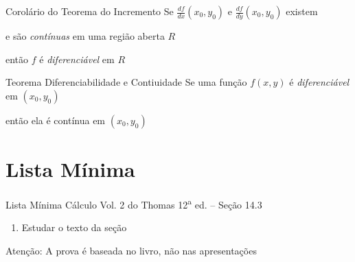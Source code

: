 \begin{frame}{Corolário do Teorema do Incremento}
    Se \(\frac{df}{dx}(x_0, y_0)\) e \(\frac{df}{dy}(x_0, y_0)\) existem

    \pause
    \vspace{0.5\baselineskip}
    e são \emph{contínuas} em uma região aberta $R$

    \pause
    \vspace{0.5\baselineskip}
    então $f$ é \emph{diferenciável} em $R$
\end{frame}

\begin{frame}{Teorema Diferenciabilidade e Contiuidade}
    Se uma função $f(x, y)$ é \emph{diferenciável} em \((x_0, y_0)\)

    \pause
    \vspace{0.5\baselineskip}
    então ela é contínua em \((x_0, y_0)\)
\end{frame}

\section{Lista Mínima}

\begin{frame}{Lista Mínima}
  Cálculo Vol. 2 do Thomas 12\textsuperscript{a} ed. -- Seção 14.3
  \begin{enumerate}
    \item Estudar o texto da seção
  \end{enumerate}

  \vfill
  Atenção: A prova é baseada no livro, não nas apresentações
\end{frame}


